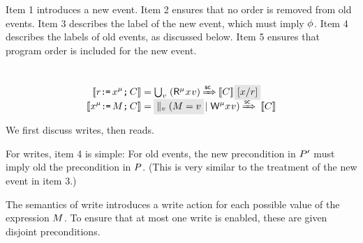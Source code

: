 Item 1 introduces a new event.  Item 2 ensures that no order is removed from old
events. Item 3 describes the label of the new event, which must imply
$\phi$. Item 4 describes the labels of old events, as discussed below.
Item 5 ensures that program order is included for the new event.

\begin{candidate}\ \vspace{-1ex}
  \label{cand2.9}
    \begin{align*}
    \sem{\aReg\GETS\aLoc^\amode\SEMI \aCmd} & =
    \smash{\textstyle\bigcup_\aVal\; (\DRmode\aLoc\aVal) \prefixsc \sem{\aCmd}\mkern4mu\, \mathhl{[\aLoc/\aReg] }}
    \\
    \sem{\aLoc^\amode\GETS{\aExp}\SEMI \aCmd} & =
    \;\smash{\mathhl{\textstyle\parallel_\aVal (\aExp=\aVal}\, \mid \DWmode\aLoc\aVal) \prefixsc\; \sem{\aCmd}}
  \end{align*}
\end{candidate}
We first discuss writes, then reads.

For writes, item 4 is simple: For old events, the new precondition in $P'$
must imply old the precondition in $P$.  (This is very similar to the
treatment of the new event in item 3.)

The semantics of write introduces a write action for each possible value of
the expression $M$.  To ensure that at most one write is enabled, these
are given disjoint preconditions.

